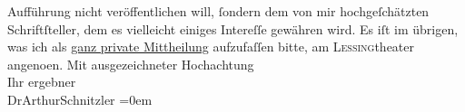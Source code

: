 \begin{ledgroupsized}[t]{13cm}
               Aufführung nicht veröffentlichen will, ſondern dem von mir hochgeſchätzten
               Schriftſteller, dem es vielleicht {\pb}einiges Intereſſe
               gewähren wird.\pend
           \pstart
           Es iſt im übrigen, was ich als \uline{ganz private
                  Mittheilung} aufzufaſſen bitte, am \textsc{Lessing}theater angeno{\geminationm}en.\pend
           \pstart
           Mit ausgezeichneter Hochachtung{\\[\baselineskip]}Ihr ergebner{\\[\baselineskip]}\spacefill\mbox{DrArthurSchnitzler}\pend
           \leftskip=0em{}
         
         \endnumbering{}\end{ledgroupsized}  \newcommand{\dateiname}{L00055}\newcommand{\titel}{Arthur Schnitzler an Wilhelm Bölsche, 19. 12. 1891}\newcommand{\editorInnen}{Martin Anton Müller und Gerd-Hermann Susen}
      